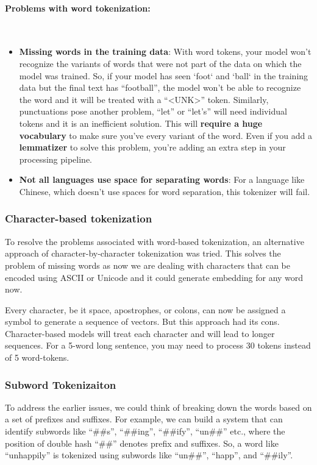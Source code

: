 \paragraph{Problems with word tokenization:} \mbox{}\\
\begin{itemize}
    \item \textbf{Missing words in the training data}: With word tokens, your model won't recognize the variants of words that were not part of the data on which the model was trained. So, if your model has seen `foot` and `ball` in the training data but the final text has ``football'', the model won't be able to recognize the word and it will be treated with a ``<UNK>'' token. Similarly, punctuations pose another problem, ``let'' or ``let's'' will need individual tokens and it is an inefficient solution. This will \textbf{require a huge vocabulary} to make sure you've every variant of the word. Even if you add a \textbf{lemmatizer} to solve this problem, you're adding an extra step in your processing pipeline.
    \item \textbf{Not all languages use space for separating words}: For a language like Chinese, which doesn't use spaces for word separation, this tokenizer will fail.
\end{itemize}

\subsubsection{Character-based tokenization}
To resolve the problems associated with word-based tokenization, an alternative approach of character-by-character tokenization was tried. This solves the problem of missing words as now we are dealing with characters that can be encoded using ASCII or Unicode and it could generate embedding for any word now. 

Every character, be it space, apostrophes, or colons, can now be assigned a symbol to generate a sequence of vectors. But this approach had its cons. Character-based models will treat each character and will lead to longer sequences. For a 5-word long sentence, you may need to process 30 tokens instead of 5 word-tokens.

\subsubsection{Subword Tokenizaiton}
To address the earlier issues, we could think of breaking down the words based on a set of prefixes and suffixes. For example, we can build a system that can identify subwords like ``\#\#s'', ``\#\#ing'', ``\#\#ify'', ``un\#\#'' etc., where the position of double hash ``\#\#'' denotes prefix and suffixes. So, a word like ``unhappily'' is tokenized using subwords like ``un\#\#'', ``happ'', and ``\#\#ily''.

